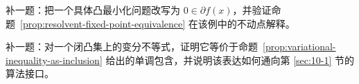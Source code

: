 \begin{exercise}[优化到零点占位]
补一题：把一个具体凸最小化问题改写为 $0\in \partial f(x)$，并验证命题~\ref{prop:resolvent-fixed-point-equivalence} 在该例中的不动点解释。
\end{exercise}

\begin{exercise}[变分不等式桥接题占位]
补一题：对一个闭凸集上的变分不等式，证明它等价于命题~\ref{prop:variational-inequality-as-inclusion} 给出的单调包含，并说明该表达如何通向第 \ref{sec:10-1} 节的算法接口。
\end{exercise}
